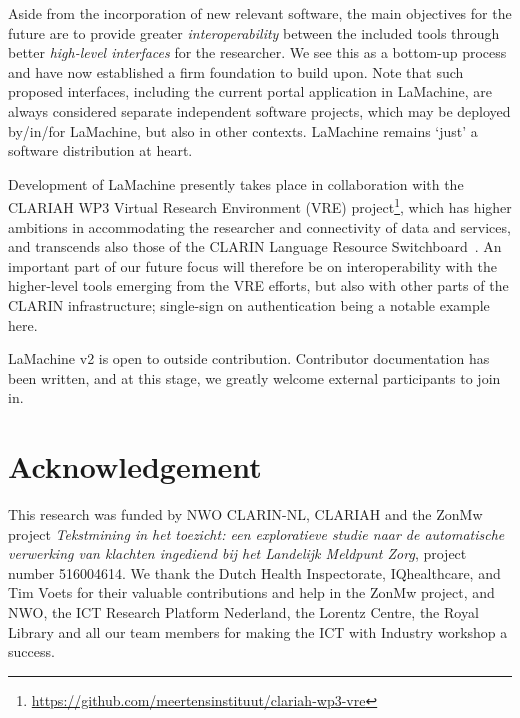 \documentclass[a4paper,11pt]{article}
\begin{document}
Aside from the incorporation of new relevant software, the main objectives for the future are to provide
greater \emph{interoperability} between the included tools through better \emph{high-level interfaces} for the
researcher. We see this as a bottom-up process and have now established a firm foundation to build upon. Note that such
proposed interfaces, including the current portal application in LaMachine, are always considered separate independent
software projects, which may be deployed by/in/for LaMachine, but also in other contexts. LaMachine remains `just'
a software distribution at heart.

Development of LaMachine presently takes place in collaboration with the CLARIAH WP3 Virtual Research Environment (VRE)
project\footnote{\url{https://github.com/meertensinstituut/clariah-wp3-vre}}, which has higher ambitions in
accommodating the researcher and connectivity of data and services, and transcends also those of the CLARIN Language
Resource Switchboard~\cite{switchboard}. An important part of our future focus will therefore be on interoperability
with the higher-level tools emerging from the VRE efforts, but also with other parts of the CLARIN infrastructure;
single-sign on authentication being a notable example here.

LaMachine v2 is open to  outside contribution. Contributor documentation has been written, and at this stage, we greatly
welcome external participants to join in.

\section*{Acknowledgement}

This research was funded by NWO CLARIN-NL, CLARIAH and the ZonMw project {\it Tekstmining in het toezicht: een exploratieve studie naar de automatische verwerking van klachten ingediend bij het Landelijk Meldpunt Zorg}, project number 516004614. We thank the Dutch Health Inspectorate, IQhealthcare, and Tim Voets for their valuable contributions and help in the ZonMw project, and NWO, the ICT Research Platform Nederland, the Lorentz Centre, the Royal Library and all our team members for making the ICT with Industry workshop a success.



\end{document}
